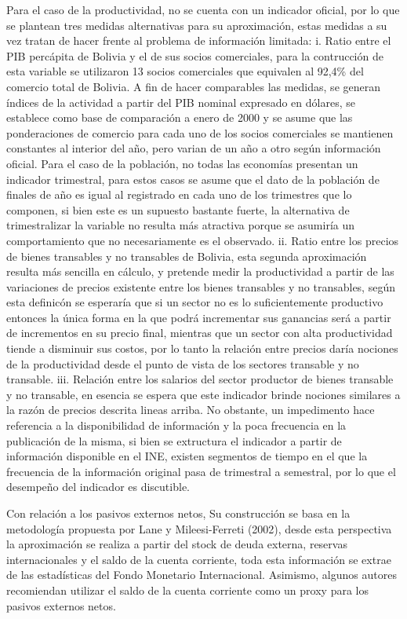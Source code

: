 \documentclass[12pt,letterpaper]{article}
\begin{document}
Para el caso de la productividad, no se cuenta con un indicador oficial, por lo que se plantean tres medidas alternativas para su aproximación, estas medidas a su vez tratan de hacer frente al problema de información limitada: i. Ratio entre el PIB percápita de Bolivia y el de sus socios comerciales, para la contrucción de esta variable se utilizaron 13 socios comerciales que equivalen al 92,4\% del comercio total de Bolivia. A fin de hacer comparables las medidas, se generan índices de la actividad a partir del PIB nominal expresado en dólares, se establece como base de comparación a enero de 2000 y se asume que las ponderaciones de comercio para cada uno de los socios comerciales se mantienen constantes al interior del año, pero varian de un año a otro según información oficial. Para el caso de la población, no todas las economías presentan un indicador trimestral, para estos casos se asume que el dato de la población de finales de año es igual al registrado en cada uno de los trimestres que lo componen, si bien este es un supuesto bastante fuerte, la alternativa de trimestralizar la variable no resulta más atractiva porque se asumiría un comportamiento que no necesariamente es el observado. 
ii. Ratio entre los precios de bienes transables y no transables de Bolivia, esta segunda aproximación resulta más sencilla en cálculo, y pretende medir la productividad a partir de las variaciones de precios existente entre los bienes transables y no transables, según esta definicón se esperaría que si un sector no es lo suficientemente productivo entonces la única forma en la que podrá incrementar sus ganancias será a partir de incrementos en su precio final, mientras que un sector con alta productividad tiende a disminuir sus costos, por lo tanto la relación entre precios daría nociones de la productividad desde el punto de vista de los sectores transable y no transable. 
iii. Relación entre los salarios del sector productor de bienes transable y no transable, en esencia se espera que este indicador brinde nociones similares a la razón de precios descrita lineas arriba. No obstante, un impedimento hace referencia a la disponibilidad de información y la poca frecuencia en la publicación de la misma, si bien se extructura el indicador a partir de información disponible en el INE, existen segmentos de tiempo en el que la frecuencia de la información original pasa de trimestral a semestral, por lo que el desempeño del indicador es discutible. 

Con relación a los pasivos externos netos, Su construcción se basa en la metodología propuesta por Lane y Mileesi-Ferreti (2002), desde esta perspectiva la aproximación se realiza a partir del stock de deuda externa, reservas internacionales y el saldo de la cuenta corriente, toda esta información se extrae de las estadísticas del Fondo Monetario Internacional. Asimismo, algunos autores recomiendan utilizar el saldo de la cuenta corriente como un proxy para los pasivos externos netos. 
\end{document}
